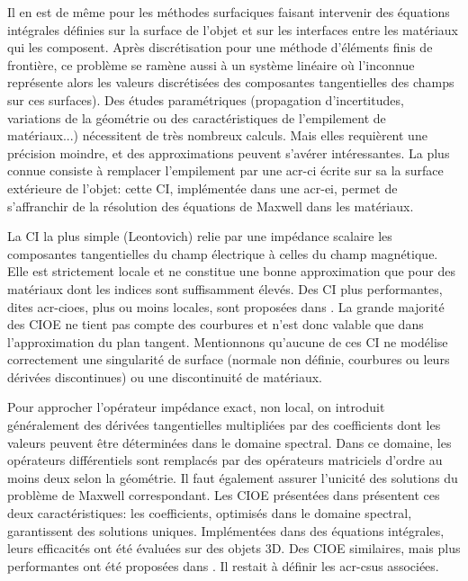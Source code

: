 Il en est de même pour les méthodes surfaciques faisant intervenir des équations intégrales définies sur la surface de l'objet et sur les interfaces entre les matériaux qui les composent. 
Après discrétisation pour une méthode d’éléments finis de frontière, ce problème se ramène aussi à un système linéaire où l'inconnue représente alors les valeurs discrétisées des composantes tangentielles des champs sur ces surfaces).
Des études paramétriques (propagation d’incertitudes, variations de la géométrie ou des caractéristiques de l'empilement de matériaux...) nécessitent de très nombreux calculs.
Mais elles requièrent une précision moindre, et des approximations peuvent s'avérer intéressantes.
La plus connue consiste à remplacer l'empilement par une \gls{acr-ci} écrite sur sa la surface extérieure de l'objet: cette CI, implémentée dans une \gls{acr-ei}, permet de s’affranchir de la résolution des équations de Maxwell dans les matériaux.

La CI la plus simple (Leontovich) relie par une impédance scalaire les composantes tangentielles du champ électrique à celles du champ magnétique.
Elle est strictement locale et ne constitue une bonne approximation que pour des matériaux dont les indices sont suffisamment élevés.
Des CI plus performantes, dites \glspl{acr-cioe}, plus ou moins locales, sont proposées dans \cite{hoppe_impedance_1995,stupfel_implementation_2015}.
La grande majorité des CIOE ne tient pas compte des courbures et n’est donc valable que dans l'approximation du plan tangent.
Mentionnons qu'aucune de ces CI ne modélise correctement une singularité de surface (normale non définie, courbures ou leurs dérivées discontinues) ou une discontinuité de matériaux.

Pour approcher l’opérateur impédance exact, non local, on introduit généralement des dérivées tangentielles multipliées par des coefficients dont les valeurs peuvent être déterminées dans le domaine spectral. Dans ce domaine, les opérateurs différentiels sont remplacés par des opérateurs matriciels d'ordre au moins deux selon la géométrie.
Il faut également assurer l’unicité des solutions du problème de Maxwell correspondant.
Les CIOE présentées dans \cite{stupfel_sufficient_2011,stupfel_implementation_2015} présentent ces deux caractéristiques: les coefficients, optimisés dans le domaine spectral, garantissent des solutions uniques.
Implémentées dans des équations intégrales, leurs efficacités ont été évaluées sur des objets 3D.
Des CIOE similaires, mais plus performantes ont été proposées dans \cite{marceaux_high-order_2000,aubakirov_electromagnetic_2014,soudais_3d_2017}.
Il restait à définir les \glspl{acr-csu} associées.

